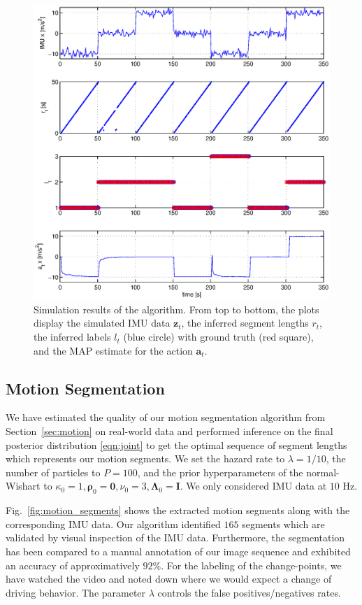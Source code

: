 \begin{figure}[t]
\centering
\includegraphics[width=0.842\columnwidth]{fig/simResult.eps}
\caption{Simulation results of the algorithm. From top to bottom, the
  plots display the simulated IMU data $\mathbf{z}_t$, the inferred
  segment lengths $r_t$, the inferred labels $l_t$ (blue circle) with
  ground truth (red square), and the MAP estimate for the action
  $\mathbf{a}_t$.\vspace{-5mm}}
\label{fig:simulation}
\end{figure}

\subsection{Motion Segmentation}
We have estimated the quality of our motion segmentation algorithm
from Section~\ref{sec:motion} on real-world data and performed inference on the
final posterior distribution \eqref{eqn:joint} to get the optimal
sequence of segment lengths which represents our motion segments. We set the
hazard rate to $\lambda=1/10$, the number of particles to $P=100$, and the prior
hyperparameters of the normal-Wishart to $\kappa_0=1,
\boldsymbol{\rho}_0=\mathbf{0},\nu_0=3,\boldsymbol{\Lambda}_0=\mathbf{I}$. We
only considered IMU data at $10$ Hz.

Fig.~\ref{fig:motion_segments} shows the extracted motion segments along with
the corresponding IMU data. Our algorithm identified $165$ segments which are
validated by visual inspection of the IMU data. Furthermore, the segmentation
has been compared to a manual annotation of our image sequence and exhibited an
accuracy of approximatively $92\%$. For the labeling of the change-points, we
have watched the video and noted down where we would expect a change of driving
behavior. The parameter $\lambda$ controls the false positives/negatives rates.

